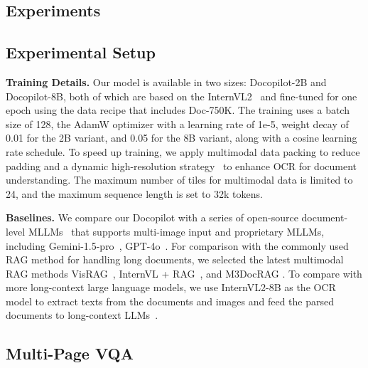 \documentclass[10pt,twocolumn,letterpaper]{article}
\def\modelname{Docopilot\xspace}
\def\dataname{Doc-750K\xspace}
\begin{document}
\begin{CJK}{UTF8}{gbsn}
\section{Experiments}

\vspace{-0.5ex}

\subsection{Experimental Setup}
\vspace{-0.5ex}

\noindent\textbf{Training Details.}
Our model is available in two sizes: \modelname-2B and \modelname-8B, both of which are based on the InternVL2~\cite{InternVL2} and fine-tuned for one epoch using the data recipe that includes \dataname. 
The training uses a batch size of 128, the AdamW optimizer with a learning rate of 1e-5, weight decay of 0.01 for the 2B variant, and 0.05 for the 8B variant, along with a cosine learning rate schedule.
To speed up training, we apply multimodal data packing to reduce padding and a dynamic high-resolution strategy~\cite{chen2024far} to enhance OCR for document understanding. 
The maximum number of tiles for multimodal data is limited to 24, and the maximum sequence length is set to 32k tokens.

\noindent\textbf{Baselines.}
We compare our \modelname with a series of open-source document-level MLLMs~\cite{huang2024minimonkey,li2023monkey,liu2024textmonkey,hu2024mplugdocowl2,zhang2024internlm,yao2024minicpm_v,li2024llavaonevision} that supports multi-image input and proprietary MLLMs, including Gemini-1.5-pro~\cite{reid2024gemini1_5}, GPT-4o~\cite{gpt4o}. For comparison with the commonly used RAG method for handling long documents, we selected the latest multimodal RAG methods VisRAG~\cite{yu2024visrag}, InternVL + RAG~\cite{wang2024needle}, and M3DocRAG \cite{cho2024m3docrag}. To compare with more long-context large language models, we use InternVL2-8B as the OCR model to extract texts from the documents and images and feed the parsed documents to long-context LLMs~\cite{dubey2024llama3, cai2024internlm2}.




\vspace{-1ex}

\subsection{Multi-Page VQA}


\end{CJK}
\end{document}
